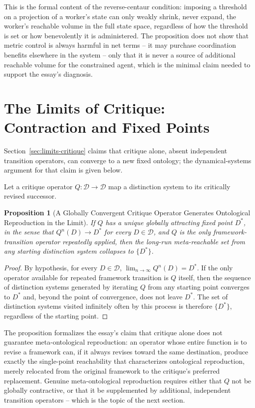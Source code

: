 \documentclass[11pt]{article}
\theoremstyle{plain}
\newtheorem{proposition}{Proposition}[section]
\begin{document}
\noindent This is the formal content of the reverse-centaur condition: imposing a threshold on a projection of a worker's state can only weakly shrink, never expand, the worker's reachable volume in the full state space, regardless of how the threshold is set or how benevolently it is administered. The proposition does not show that metric control is always harmful in net terms -- it may purchase coordination benefits elsewhere in the system -- only that it is never a source of additional reachable volume for the constrained agent, which is the minimal claim needed to support the essay's diagnosis.

\section{The Limits of Critique: Contraction and Fixed Points}
\label{app:critique-fixed-points}

\noindent Section~\ref{sec:limits-critique} claims that critique alone, absent independent transition operators, can converge to a new fixed ontology; the dynamical-systems argument for that claim is given below.

Let a critique operator $Q : \mathcal{D} \to \mathcal{D}$ map a distinction system to its critically revised successor.

\begin{proposition}[A Globally Convergent Critique Operator Generates Ontological Reproduction in the Limit]
If $Q$ has a unique globally attracting fixed point $D^\ast$, in the sense that $Q^n(D) \to D^\ast$ for every $D \in \mathcal{D}$, and $Q$ is the only framework-transition operator repeatedly applied, then the long-run meta-reachable set from any starting distinction system collapses to $\{D^\ast\}$.
\end{proposition}
\begin{proof}
By hypothesis, for every $D \in \mathcal{D}$, $\lim_{n\to\infty} Q^n(D) = D^\ast$. If the only operator available for repeated framework transition is $Q$ itself, then the sequence of distinction systems generated by iterating $Q$ from any starting point converges to $D^\ast$ and, beyond the point of convergence, does not leave $D^\ast$. The set of distinction systems visited infinitely often by this process is therefore $\{D^\ast\}$, regardless of the starting point.
\end{proof}

\noindent The proposition formalizes the essay's claim that critique alone does not guarantee meta-ontological reproduction: an operator whose entire function is to revise a framework can, if it always revises toward the same destination, produce exactly the single-point reachability that characterizes ontological reproduction, merely relocated from the original framework to the critique's preferred replacement. Genuine meta-ontological reproduction requires either that $Q$ not be globally contractive, or that it be supplemented by additional, independent transition operators -- which is the topic of the next section.
\end{document}
